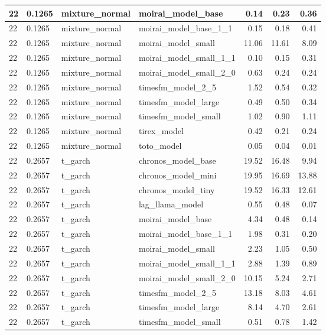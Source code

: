{\begin{tabular}{llllrrr}
22 & 0.1265 & mixture\_normal & moirai\_model\_base & 0.14 & 0.23 & 0.36 \\
\midrule
22 & 0.1265 & mixture\_normal & moirai\_model\_base\_1\_1 & 0.15 & 0.18 & 0.41 \\
\midrule
22 & 0.1265 & mixture\_normal & moirai\_model\_small & 11.06 & 11.61 & 8.09 \\
\midrule
22 & 0.1265 & mixture\_normal & moirai\_model\_small\_1\_1 & 0.10 & 0.15 & 0.31 \\
\midrule
22 & 0.1265 & mixture\_normal & moirai\_model\_small\_2\_0 & 0.63 & 0.24 & 0.24 \\
\midrule
22 & 0.1265 & mixture\_normal & timesfm\_model\_2\_5 & 1.52 & 0.54 & 0.32 \\
\midrule
22 & 0.1265 & mixture\_normal & timesfm\_model\_large & 0.49 & 0.50 & 0.34 \\
\midrule
22 & 0.1265 & mixture\_normal & timesfm\_model\_small & 1.02 & 0.90 & 1.11 \\
\midrule
22 & 0.1265 & mixture\_normal & tirex\_model & 0.42 & 0.21 & 0.24 \\
\midrule
22 & 0.1265 & mixture\_normal & toto\_model & 0.05 & 0.04 & 0.01 \\
\midrule
22 & 0.2657 & t\_garch & chronos\_model\_base & 19.52 & 16.48 & 9.94 \\
\midrule
22 & 0.2657 & t\_garch & chronos\_model\_mini & 19.95 & 16.69 & 13.88 \\
\midrule
22 & 0.2657 & t\_garch & chronos\_model\_tiny & 19.52 & 16.33 & 12.61 \\
\midrule
22 & 0.2657 & t\_garch & lag\_llama\_model & 0.55 & 0.48 & 0.07 \\
\midrule
22 & 0.2657 & t\_garch & moirai\_model\_base & 4.34 & 0.48 & 0.14 \\
\midrule
22 & 0.2657 & t\_garch & moirai\_model\_base\_1\_1 & 1.98 & 0.31 & 0.20 \\
\midrule
22 & 0.2657 & t\_garch & moirai\_model\_small & 2.23 & 1.05 & 0.50 \\
\midrule
22 & 0.2657 & t\_garch & moirai\_model\_small\_1\_1 & 2.88 & 1.39 & 0.89 \\
\midrule
22 & 0.2657 & t\_garch & moirai\_model\_small\_2\_0 & 10.15 & 5.24 & 2.71 \\
\midrule
22 & 0.2657 & t\_garch & timesfm\_model\_2\_5 & 13.18 & 8.03 & 4.61 \\
\midrule
22 & 0.2657 & t\_garch & timesfm\_model\_large & 8.14 & 4.70 & 2.61 \\
\midrule
22 & 0.2657 & t\_garch & timesfm\_model\_small & 0.51 & 0.78 & 1.42 \\

\end{tabular}}
